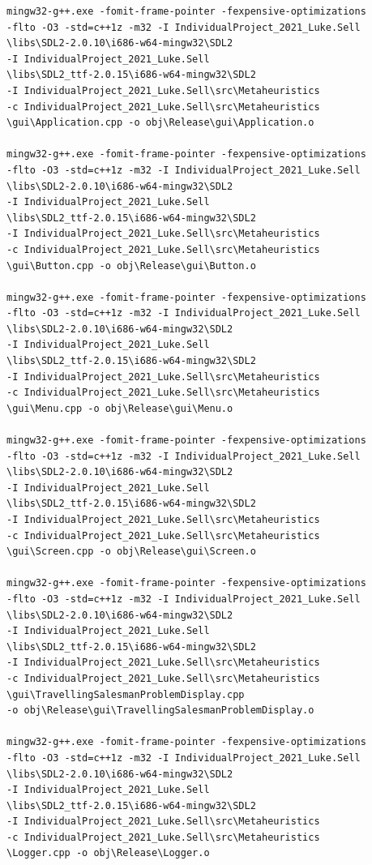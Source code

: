 \documentclass[]{final_report}
\begin{document}
\begin{verbatim}
mingw32-g++.exe -fomit-frame-pointer -fexpensive-optimizations
-flto -O3 -std=c++1z -m32 -I IndividualProject_2021_Luke.Sell
\libs\SDL2-2.0.10\i686-w64-mingw32\SDL2
-I IndividualProject_2021_Luke.Sell
\libs\SDL2_ttf-2.0.15\i686-w64-mingw32\SDL2
-I IndividualProject_2021_Luke.Sell\src\Metaheuristics
-c IndividualProject_2021_Luke.Sell\src\Metaheuristics
\gui\Application.cpp -o obj\Release\gui\Application.o

mingw32-g++.exe -fomit-frame-pointer -fexpensive-optimizations
-flto -O3 -std=c++1z -m32 -I IndividualProject_2021_Luke.Sell
\libs\SDL2-2.0.10\i686-w64-mingw32\SDL2
-I IndividualProject_2021_Luke.Sell
\libs\SDL2_ttf-2.0.15\i686-w64-mingw32\SDL2
-I IndividualProject_2021_Luke.Sell\src\Metaheuristics
-c IndividualProject_2021_Luke.Sell\src\Metaheuristics
\gui\Button.cpp -o obj\Release\gui\Button.o

mingw32-g++.exe -fomit-frame-pointer -fexpensive-optimizations
-flto -O3 -std=c++1z -m32 -I IndividualProject_2021_Luke.Sell
\libs\SDL2-2.0.10\i686-w64-mingw32\SDL2
-I IndividualProject_2021_Luke.Sell
\libs\SDL2_ttf-2.0.15\i686-w64-mingw32\SDL2
-I IndividualProject_2021_Luke.Sell\src\Metaheuristics
-c IndividualProject_2021_Luke.Sell\src\Metaheuristics
\gui\Menu.cpp -o obj\Release\gui\Menu.o

mingw32-g++.exe -fomit-frame-pointer -fexpensive-optimizations
-flto -O3 -std=c++1z -m32 -I IndividualProject_2021_Luke.Sell
\libs\SDL2-2.0.10\i686-w64-mingw32\SDL2
-I IndividualProject_2021_Luke.Sell
\libs\SDL2_ttf-2.0.15\i686-w64-mingw32\SDL2
-I IndividualProject_2021_Luke.Sell\src\Metaheuristics
-c IndividualProject_2021_Luke.Sell\src\Metaheuristics
\gui\Screen.cpp -o obj\Release\gui\Screen.o

mingw32-g++.exe -fomit-frame-pointer -fexpensive-optimizations
-flto -O3 -std=c++1z -m32 -I IndividualProject_2021_Luke.Sell
\libs\SDL2-2.0.10\i686-w64-mingw32\SDL2
-I IndividualProject_2021_Luke.Sell
\libs\SDL2_ttf-2.0.15\i686-w64-mingw32\SDL2
-I IndividualProject_2021_Luke.Sell\src\Metaheuristics
-c IndividualProject_2021_Luke.Sell\src\Metaheuristics
\gui\TravellingSalesmanProblemDisplay.cpp
-o obj\Release\gui\TravellingSalesmanProblemDisplay.o

mingw32-g++.exe -fomit-frame-pointer -fexpensive-optimizations
-flto -O3 -std=c++1z -m32 -I IndividualProject_2021_Luke.Sell
\libs\SDL2-2.0.10\i686-w64-mingw32\SDL2
-I IndividualProject_2021_Luke.Sell
\libs\SDL2_ttf-2.0.15\i686-w64-mingw32\SDL2
-I IndividualProject_2021_Luke.Sell\src\Metaheuristics
-c IndividualProject_2021_Luke.Sell\src\Metaheuristics
\Logger.cpp -o obj\Release\Logger.o


\end{verbatim}
\end{document}
